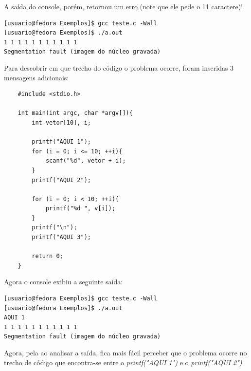 \documentclass[12pt]{article}
\newcommand\tab[1][1cm]{\hspace*{#1}}
\begin{document}
\par\tab A saída do console, porém, retornou um erro (note que ele pede o 11 caractere)!

\hspace{0.25cm}
\begin{tcolorbox}[colback=black!5!white,colframe=black!75!white,title=Console: usuario@fedora:\~/Exemplos]
    \begin{verbatim}
[usuario@fedora Exemplos]$ gcc teste.c -Wall
[usuario@fedora Exemplos]$ ./a.out
1 1 1 1 1 1 1 1 1 1 1
Segmentation fault (imagem do núcleo gravada)
    \end{verbatim}
\end{tcolorbox}

\par\tab Para descobrir em que trecho do código o problema ocorre, foram inseridas 3 mensagens adicionais:

\hspace{0.25cm}
\begin{lstlisting}
    #include <stdio.h>
    
    int main(int argc, char *argv[]){
        int vetor[10], i;
        
        printf("AQUI 1");
        for (i = 0; i <= 10; ++i){
            scanf("%d", vetor + i);
        }
        printf("AQUI 2");
        
        for (i = 0; i < 10; ++i){
            printf("%d ", v[i]);
        }
        printf("\n");
        printf("AQUI 3");
        
        return 0;
    }
\end{lstlisting}

\par\tab Agora o console exibiu a seguinte saída:

\hspace{0.25cm}
\begin{tcolorbox}[colback=black!5!white,colframe=black!75!white,title=Console: usuario@fedora:\~/Exemplos]
    \begin{verbatim}
[usuario@fedora Exemplos]$ gcc teste.c -Wall
[usuario@fedora Exemplos]$ ./a.out
AQUI 1
1 1 1 1 1 1 1 1 1 1 1
Segmentation fault (imagem do núcleo gravada)
    \end{verbatim}
\end{tcolorbox}

\par\tab Agora, pela ao analisar a saída, fica mais fácil perceber que o problema ocorre no trecho de código que encontra-se entre o \textit{printf("AQUI 1")} e o \textit{printf("AQUI 2")}.
\end{document}

